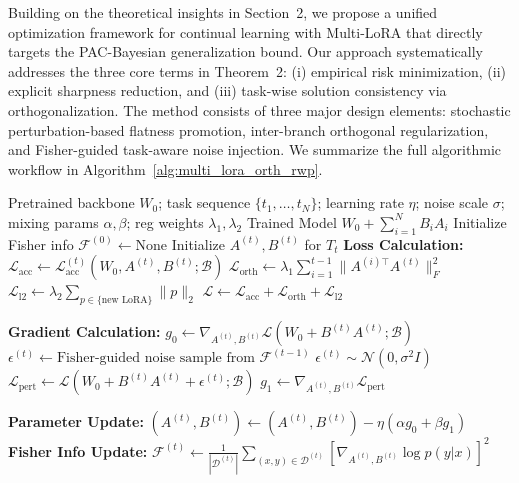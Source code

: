 \documentclass[letterpaper]{article} %
\begin{document}
Building on the theoretical insights in Section~2, we propose a unified optimization framework for continual learning with Multi-LoRA that directly targets the PAC-Bayesian generalization bound. Our approach systematically addresses the three core terms in Theorem~2: (i) empirical risk minimization, (ii) explicit sharpness reduction, and (iii) task-wise solution consistency via orthogonalization. The method consists of three major design elements: stochastic perturbation-based flatness promotion, inter-branch orthogonal regularization, and Fisher-guided task-aware noise injection. We summarize the full algorithmic workflow in Algorithm~\ref{alg:multi_lora_orth_rwp}.


\begin{algorithm}[t]
\caption{Multi-LoRA Training with Task-Aware Perturbation and Orthogonalization}
\label{alg:multi_lora_orth_rwp}
\begin{algorithmic}[1]
\REQUIRE Pretrained backbone $W_0$; task sequence $\{t_1, \dots, t_N\}$; learning rate $\eta$; noise scale $\sigma$; mixing params $\alpha,\beta$; reg weights $\lambda_1,\lambda_2$
\ENSURE Trained Model $W_0+\sum_{i=1}^NB_iA_i$
\STATE Initialize Fisher info $\mathcal{F}^{(0)} \gets \text{None}$
    \STATE Initialize $A^{(t)}, B^{(t)}$ for $T_t$
        \STATE \textbf{Loss Calculation:}
        \STATE $\mathcal{L}_{\text{acc}} \gets \mathcal{L}_{\text{acc}}^{(t)}(W_0, A^{(t)}, B^{(t)}; \mathcal{B})$
        \STATE $\mathcal{L}_{\text{orth}} \gets \lambda_1 \sum_{i=1}^{t-1} \|A^{(i)\top} A^{(t)}\|_F^2$
        \STATE $\mathcal{L}_{\text{l2}} \gets \lambda_2 \sum_{p \in \{\text{new LoRA}\}} \|p\|_2$
        \STATE $\mathcal{L} \gets \mathcal{L}_{\text{acc}} + \mathcal{L}_{\text{orth}} + \mathcal{L}_{\text{l2}}$
        
        \STATE \textbf{Gradient Calculation:}
        \STATE $g_0 \gets \nabla_{A^{(t)}, B^{(t)}} \mathcal{L}(W_0 + B^{(t)}A^{(t)}; \mathcal{B})$
            \STATE $\epsilon^{(t)} \gets \text{Fisher-guided noise sample from } \mathcal{F}^{(t-1)}$
        \ELSE
            \STATE $\epsilon^{(t)} \sim \mathcal{N}(0, \sigma^2 I)$
        \ENDIF
        \STATE $\mathcal{L}_{\text{pert}} \gets \mathcal{L}(W_0 + B^{(t)}A^{(t)} + \epsilon^{(t)}; \mathcal{B})$
        \STATE $g_1 \gets \nabla_{A^{(t)}, B^{(t)}} \mathcal{L}_{\text{pert}}$
        
        \STATE \textbf{Parameter Update:}
        \STATE $(A^{(t)}, B^{(t)}) \gets (A^{(t)}, B^{(t)}) - \eta (\alpha g_0 + \beta g_1)$
    \ENDFOR
    \STATE \textbf{Fisher Info Update:}
    \STATE $\mathcal{F}^{(t)} \gets \frac{1}{|\mathcal{D}^{(t)}|} \sum_{(x,y) \in \mathcal{D}^{(t)}} \left[\nabla_{A^{(t)}, B^{(t)}} \log p(y|x)\right]^2$
\ENDFOR
\end{algorithmic}
\end{algorithm}
\end{document}
